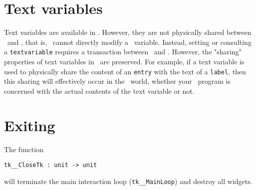 \section{Text variables}
Text variables are available in \camltk. However, they are not physically
shared between \caml\ and \tk, that is, \tk\ cannot directly modify
a \caml\ variable.
Instead, setting or consulting a \verb|textvariable| requires a transaction
between \caml\ and \tk. However, the "sharing" properties of 
text variables in \tk\ are preserved. For example, if a
text variable is used to physically share the content of an {\tt entry} with
the text of a {\tt label}, then this sharing will effectively occur in the
\tk\ world, whether your \caml\ program is concerned with the actual
contents of the text variable or not. 


\section{Exiting}
The function
\begin{verbatim}
tk__CloseTk : unit -> unit
\end{verbatim} 
will terminate the main interaction loop (\verb|tk__MainLoop|) and
destroy all widgets.


